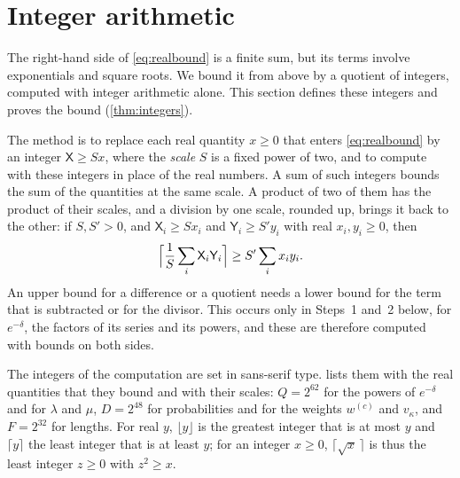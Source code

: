 \section{Integer arithmetic}\label{sec:integers}

The right-hand side of \eqref{eq:realbound} is a finite sum, but its terms involve exponentials and square roots. We bound it from above by a quotient of integers, computed with integer arithmetic alone. This section defines these integers and proves the bound (\cref{thm:integers}).

The method is to replace each real quantity $x\ge0$ that enters \eqref{eq:realbound} by an integer $\mathsf{X}\ge Sx$, where the \emph{scale} $S$ is a fixed power of two, and to compute with these integers in place of the real numbers. A sum of such integers bounds the sum of the quantities at the same scale. A product of two of them has the product of their scales, and a division by one scale, rounded up, brings it back to the other: if $S,S'>0$, and $\mathsf{X}_i\ge Sx_i$ and $\mathsf{Y}_i\ge S'y_i$ with real $x_i,y_i\ge0$, then
\begin{equation}\label{eq:rule}
\Bigl\lceil\frac1S\sum_i\mathsf{X}_i\mathsf{Y}_i\Bigr\rceil\ge S'\sum_ix_iy_i .
\end{equation}
An upper bound for a difference or a quotient needs a lower bound for the term that is subtracted or for the divisor. This occurs only in Steps~1 and~2 below, for $e^{-\delta}$, the factors of its series and its powers, and these are therefore computed with bounds on both sides.

The integers of the computation are set in sans-serif type.  lists them with the real quantities that they bound and with their scales: $Q=2^{62}$ for the powers of $e^{-\delta}$ and for $\lambda$ and $\mu$, $D=2^{48}$ for probabilities and for the weights $w^{(c)}$ and $v_\kappa$, and $F=2^{32}$ for lengths. For real $y$, $\lfloor y\rfloor$ is the greatest integer that is at most $y$ and $\lceil y\rceil$ the least integer that is at least $y$; for an integer $x\ge0$, $\lceil\sqrt{x}\,\rceil$ is thus the least integer $z\ge0$ with $z^2\ge x$.

